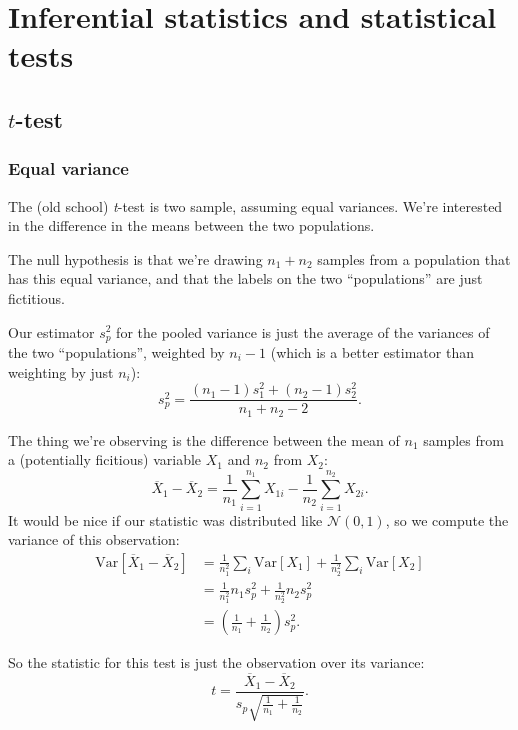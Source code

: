
\chapter{Inferential statistics and statistical tests}

\section{$t$-test}

\subsection{Equal variance}\label{equal-variance}

The (old school) \emph{t}-test is two sample, assuming equal variances.
We're interested in the difference in the means between the two
populations.

The null hypothesis is that we're drawing \(n_1 + n_2\) samples from a
population that has this equal variance, and that the labels on the two
``populations'' are just fictitious.

Our estimator \(s_p^2\) for the pooled variance is just the average of
the variances of the two ``populations'', weighted by \(n_i - 1\) (which
is a better estimator than weighting by just \(n_i\)): \[
s_p^2 = \frac{(n_1 - 1) s_1^2 + (n_2 - 1) s_2^2}{n_1 + n_2 - 2}.
\]

The thing we're observing is the difference between the mean of \(n_1\)
samples from a (potentially ficitious) variable \(X_1\) and \(n_2\) from
\(X_2\): \[
\overline{X}_1 - \overline{X}_2 = \frac{1}{n_1} \sum_{i=1}^{n_1} X_{1i} - \frac{1}{n_2} \sum_{i=1}^{n_2} X_{2i}.
\] It would be nice if our statistic was distributed like
\(\mathcal{N}(0, 1)\), so we compute the variance of this observation:
\[
\begin{aligned}
\mathrm{Var}\left[ \overline{X}_1 - \overline{X}_2 \right]
  &= \frac{1}{n_1^2} \sum_i \mathrm{Var}[X_1] + \frac{1}{n_2^2} \sum_i \mathrm{Var}[X_2] \\
  &= \frac{1}{n_1^2} n_1 s_p^2 + \frac{1}{n_2^2} n_2 s_p^2 \\
  &= \left( \frac{1}{n_1} + \frac{1}{n_2} \right) s_p^2.
\end{aligned}
\]

So the statistic for this test is just the observation over its
variance: \[
t = \frac{\overline{X}_1 - \overline{X}_2}{s_p \sqrt{\frac{1}{n_1} + \frac{1}{n_2}}}.
\]

